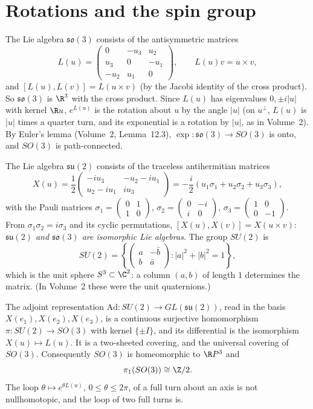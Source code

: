\section{Rotations and the spin group}

The Lie algebra $\mathfrak{so}(3)$ consists of the antisymmetric matrices
\[L(u)=\begin{pmatrix}0&-u_3&u_2\\u_3&0&-u_1\\-u_2&u_1&0\end{pmatrix},\qquad L(u)v=u\times v,\]
and $[L(u),L(v)]=L(u\times v)$ (by the Jacobi identity of the cross product). So $\mathfrak{so}(3)$ is $\R^3$ with the cross product. Since $L(u)$ has eigenvalues $0,\pm i|u|$ with kernel $\R u$, $e^{L(u)}$ is the
rotation about $u$ by the angle $|u|$ (on $u^\perp$, $L(u)$ is $|u|$ times a quarter turn, and its exponential is a rotation by $|u|$, as in Volume~2). By Euler's lemma (Volume~2, Lemma~12.3), $\exp\colon\mathfrak{so}(3)\to SO(3)$ is
onto, and $SO(3)$ is path-connected.

The Lie algebra $\mathfrak{su}(2)$ consists of the traceless antihermitian matrices
\[X(u)=\frac12\begin{pmatrix}-iu_3&-u_2-iu_1\\u_2-iu_1&iu_3\end{pmatrix}=-\frac i2(u_1\sigma_1+u_2\sigma_2+u_3\sigma_3),\]
with the Pauli matrices $\sigma_1=\begin{pmatrix}0&1\\1&0\end{pmatrix}$, $\sigma_2=\begin{pmatrix}0&-i\\i&0\end{pmatrix}$, $\sigma_3=\begin{pmatrix}1&0\\0&-1\end{pmatrix}$. From $\sigma_1\sigma_2=i\sigma_3$ and its cyclic permutations,
$[X(u),X(v)]=X(u\times v)$: \emph{$\mathfrak{su}(2)$ and $\mathfrak{so}(3)$ are isomorphic Lie algebras}. The group $SU(2)$ is
\[SU(2)=\left\{\begin{pmatrix}a&-\bar b\\b&\bar a\end{pmatrix}:|a|^2+|b|^2=1\right\},\]
which is the unit sphere $S^3\subset\C^2$: a column $(a,b)$ of length $1$ determines the matrix. (In Volume~2 these were the unit quaternions.)

\begin{theorem}\label{thm:spin}
The adjoint representation $\mathrm{Ad}\colon SU(2)\to GL(\mathfrak{su}(2))$, read in the basis $X(e_1),X(e_2),X(e_3)$, is a continuous surjective homomorphism $\pi\colon SU(2)\to SO(3)$ with kernel $\{\pm I\}$, and its differential is
the isomorphism $X(u)\mapsto L(u)$. It is a two-sheeted covering, and the universal covering of $SO(3)$. Consequently $SO(3)$ is homeomorphic to $\R P^3$ and
\[\pi_1(SO(3))\cong\Z/2.\]
The loop $\theta\mapsto e^{\theta L(u)}$, $0\le\theta\le2\pi$, of a full turn about an axis is not nullhomotopic, and the loop of two full turns is.
\end{theorem}

